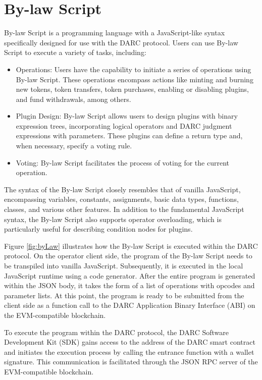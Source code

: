 \documentclass[main.tex]{subfiles}
\begin{document}
\section{By-law Script}

By-law Script is a programming language with a JavaScript-like syntax specifically designed for use with the DARC protocol. Users can use By-law Script to execute a variety of tasks, including:

\begin{itemize}
    \item Operations: Users have the capability to initiate a series of operations using By-law Script. These operations encompass actions like minting and burning new tokens, token transfers, token purchases, enabling or disabling plugins, and fund withdrawals, among others.

    \item Plugin Design: By-law Script allows users to design plugins with binary expression trees, incorporating logical operators and DARC judgment expressions with parameters. These plugins can define a return type and, when necessary, specify a voting rule.

    \item Voting: By-law Script facilitates the process of voting for the current operation.
\end{itemize}

The syntax of the By-law Script closely resembles that of vanilla JavaScript, encompassing variables, constants, assignments, basic data types, functions, classes, and various other features. In addition to the fundamental JavaScript syntax, the By-law Script also supports operator overloading, which is particularly useful for describing condition nodes for plugins.

Figure \ref{fig:byLaw} illustrates how the By-law Script is executed within the DARC protocol. On the operator client side, the program of the By-law Script needs to be transpiled into vanilla JavaScript. Subsequently, it is executed in the local JavaScript runtime using a code generator. After the entire program is generated within the JSON body, it takes the form of a list of operations with opcodes and parameter lists. At this point, the program is ready to be submitted from the client side as a function call to the DARC Application Binary Interface (ABI) on the EVM-compatible blockchain.

To execute the program within the DARC protocol, the DARC Software Development Kit (SDK) gains access to the address of the DARC smart contract and initiates the execution process by calling the entrance function with a wallet signature. This communication is facilitated through the JSON RPC server of the EVM-compatible blockchain.
\end{document}

